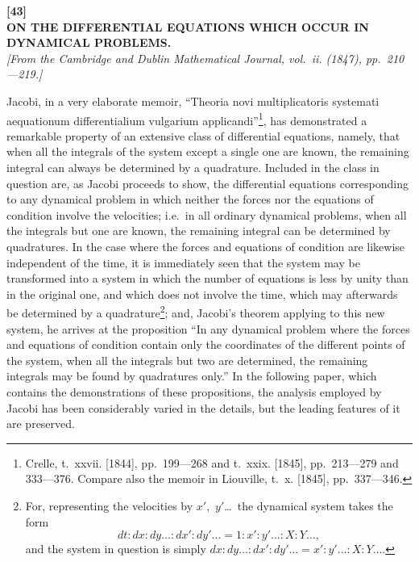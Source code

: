 \documentclass[11pt,a4paper]{article}
\begin{document}

\newpage
\begin{center}
\textbf{[43]}\\[4pt]
\textbf{\large ON THE DIFFERENTIAL EQUATIONS WHICH OCCUR IN\\DYNAMICAL PROBLEMS.}\\[4pt]
\textit{[From the Cambridge and Dublin Mathematical Journal, vol.~ii. (1847), pp.~210---219.]}
\end{center}

\vspace{6pt}

Jacobi, in a very elaborate memoir, ``Theoria novi multiplicatoris systemati aequationum differentialium vulgarium applicandi''\footnote{Crelle, t.~xxvii. [1844], pp.~199---268 and t.~xxix. [1845], pp.~213---279 and 333---376. Compare also the memoir in Liouville, t.~x. [1845], pp.~337---346.}, has demonstrated a remarkable property of an extensive class of differential equations, namely, that when all the integrals of the system except a single one are known, the remaining integral can always be determined by a quadrature. Included in the class in question are, as Jacobi proceeds to show, the differential equations corresponding to any dynamical problem in which neither the forces nor the equations of condition involve the velocities; i.e.~in all ordinary dynamical problems, when all the integrals but one are known, the remaining integral can be determined by quadratures. In the case where the forces and equations of condition are likewise independent of the time, it is immediately seen that the system may be transformed into a system in which the number of equations is less by unity than in the original one, and which does not involve the time, which may afterwards be determined by a quadrature\footnote{For, representing the velocities by $x'$,~$y'$\ldots\ the dynamical system takes the form
\[
dt : dx : dy\ldots : dx' : dy'\ldots = 1 : x' : y'\ldots : X : Y\ldots,
\]
and the system in question is simply $dx : dy\ldots : dx' : dy'\ldots = x' : y'\ldots : X : Y\ldots$.}; and, Jacobi's theorem applying to this new system, he arrives at the proposition ``In any dynamical problem where the forces and equations of condition contain only the coordinates of the different points of the system, when all the integrals but two are determined, the remaining integrals may be found by quadratures only.'' In the following paper, which contains the demonstrations of these propositions, the analysis employed by Jacobi has been considerably varied in the details, but the leading features of it are preserved.
\end{document}
